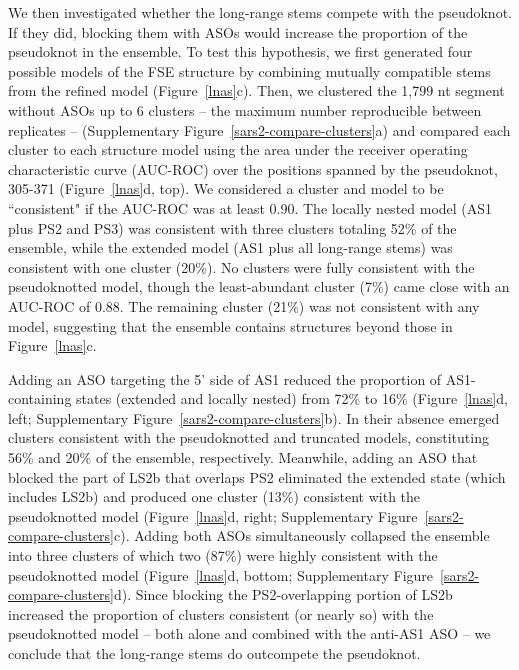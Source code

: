 \documentclass[main.tex]{subfiles}
\begin{document}
We then investigated whether the long-range stems compete with the pseudoknot.
If they did, blocking them with ASOs would increase the proportion of the pseudoknot in the ensemble.
To test this hypothesis, we first generated four possible models of the FSE structure by combining mutually compatible stems from the refined model (Figure~\ref{lnas}c).
Then, we clustered the 1,799 nt segment without ASOs up to 6 clusters -- the maximum number reproducible between replicates -- (Supplementary Figure~\ref{sars2-compare-clusters}a) and compared each cluster to each structure model using the area under the receiver operating characteristic curve (AUC-ROC) over the positions spanned by the pseudoknot, 305-371 (Figure~\ref{lnas}d, top).
We considered a cluster and model to be ``consistent" if the AUC-ROC was at least 0.90.
The locally nested model (AS1 plus PS2 and PS3) was consistent with three clusters totaling 52\% of the ensemble, while the extended model (AS1 plus all long-range stems) was consistent with one cluster (20\%).
No clusters were fully consistent with the pseudoknotted model, though the least-abundant cluster (7\%) came close with an AUC-ROC of 0.88.
The remaining cluster (21\%) was not consistent with any model, suggesting that the ensemble contains structures beyond those in Figure~\ref{lnas}c.

Adding an ASO targeting the 5' side of AS1 reduced the proportion of AS1-containing states (extended and locally nested) from 72\% to 16\% (Figure~\ref{lnas}d, left; Supplementary Figure~\ref{sars2-compare-clusters}b).
In their absence emerged clusters consistent with the pseudoknotted and truncated models, constituting 56\% and 20\% of the ensemble, respectively.
Meanwhile, adding an ASO that blocked the part of LS2b that overlaps PS2 eliminated the extended state (which includes LS2b) and produced one cluster (13\%) consistent with the pseudoknotted model (Figure~\ref{lnas}d, right; Supplementary Figure~\ref{sars2-compare-clusters}c).
Adding both ASOs simultaneously collapsed the ensemble into three clusters of which two (87\%) were highly consistent with the pseudoknotted model (Figure~\ref{lnas}d, bottom; Supplementary Figure~\ref{sars2-compare-clusters}d).
Since blocking the PS2-overlapping portion of LS2b increased the proportion of clusters consistent (or nearly so) with the pseudoknotted model -- both alone and combined with the anti-AS1 ASO -- we conclude that the long-range stems do outcompete the pseudoknot.
\end{document}
